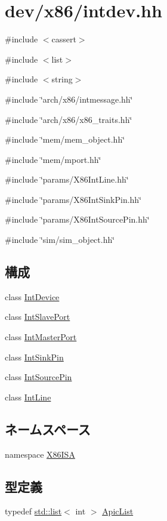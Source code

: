 \hypertarget{intdev_8hh}{
\section{dev/x86/intdev.hh}
\label{intdev_8hh}
}
{\ttfamily \#include $<$cassert$>$}\par
{\ttfamily \#include $<$list$>$}\par
{\ttfamily \#include $<$string$>$}\par
{\ttfamily \#include \char`\"{}arch/x86/intmessage.hh\char`\"{}}\par
{\ttfamily \#include \char`\"{}arch/x86/x86\_\-traits.hh\char`\"{}}\par
{\ttfamily \#include \char`\"{}mem/mem\_\-object.hh\char`\"{}}\par
{\ttfamily \#include \char`\"{}mem/mport.hh\char`\"{}}\par
{\ttfamily \#include \char`\"{}params/X86IntLine.hh\char`\"{}}\par
{\ttfamily \#include \char`\"{}params/X86IntSinkPin.hh\char`\"{}}\par
{\ttfamily \#include \char`\"{}params/X86IntSourcePin.hh\char`\"{}}\par
{\ttfamily \#include \char`\"{}sim/sim\_\-object.hh\char`\"{}}\par
\subsection*{構成}
\begin{DoxyCompactItemize}
\item 
class \hyperlink{classX86ISA_1_1IntDevice}{IntDevice}
\item 
class \hyperlink{classX86ISA_1_1IntDevice_1_1IntSlavePort}{IntSlavePort}
\item 
class \hyperlink{classX86ISA_1_1IntDevice_1_1IntMasterPort}{IntMasterPort}
\item 
class \hyperlink{classX86ISA_1_1IntSinkPin}{IntSinkPin}
\item 
class \hyperlink{classX86ISA_1_1IntSourcePin}{IntSourcePin}
\item 
class \hyperlink{classX86ISA_1_1IntLine}{IntLine}
\end{DoxyCompactItemize}
\subsection*{ネームスペース}
\begin{DoxyCompactItemize}
\item 
namespace \hyperlink{namespaceX86ISA}{X86ISA}
\end{DoxyCompactItemize}
\subsection*{型定義}
\begin{DoxyCompactItemize}
\item 
typedef \hyperlink{classstd_1_1list}{std::list}$<$ int $>$ \hyperlink{namespaceX86ISA_a25e7a37aec0875a2333d311783729d23}{ApicList}
\end{DoxyCompactItemize}
